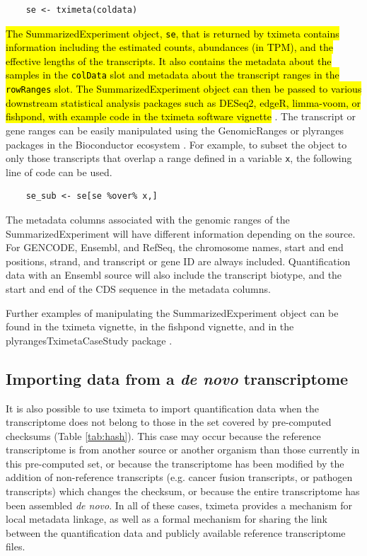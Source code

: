 \begin{verbatim}
    se <- tximeta(coldata)
\end{verbatim}

\hl{The SummarizedExperiment object, \texttt{se}, that is returned by
tximeta contains information including the estimated counts,
abundances (in TPM), and the effective lengths of the transcripts.
It also contains the metadata about the samples in the
\texttt{colData} slot and metadata about the transcript ranges in the
\texttt{rowRanges} slot.
The SummarizedExperiment object can then be passed to various
downstream statistical analysis packages such as DESeq2, edgeR,
limma-voom, or fishpond, with example code in the tximeta software
vignette} \cite{deseq2,edger,limma,voom,swish}. The
transcript or gene ranges can be easily manipulated using the
GenomicRanges or plyranges packages in the Bioconductor ecosystem
\cite{granges,Lee2019}. For example, to subset the object to only
those transcripts that overlap a range defined in a variable
\texttt{x}, the following line of code can be used.

\begin{verbatim}
    se_sub <- se[se %over% x,]
\end{verbatim}

The metadata columns associated with the genomic ranges of the
SummarizedExperiment will have different information depending on the
source. For GENCODE, Ensembl, and RefSeq, the chromosome names, start
and end positions, strand, and transcript or gene ID are always
included. Quantification data with an Ensembl source will also include
the transcript biotype, and the start and end of the CDS sequence in
the metadata columns.

Further examples of manipulating the SummarizedExperiment object can
be found in the tximeta vignette, in the fishpond vignette, and in the
plyrangesTximetaCaseStudy package \cite{casestudy}.

\subsection*{Importing data from a \textit{de novo} transcriptome}

It is also possible to use tximeta to import quantification data when
the transcriptome does not belong to those in the set covered by pre-computed
checksums (Table \ref{tab:hash}). This case may occur because the
reference transcriptome is from another source or another organism
than those currently in this pre-computed set, or because the
transcriptome has been modified by the addition of non-reference
transcripts (e.g. cancer fusion transcripts, or pathogen transcripts)
which changes the checksum, or because the entire transcriptome has
been assembled \textit{de novo}. In all of these cases, tximeta
provides a mechanism for local metadata linkage, as well as a formal
mechanism for sharing the link between the quantification data and
publicly available reference transcriptome files.

